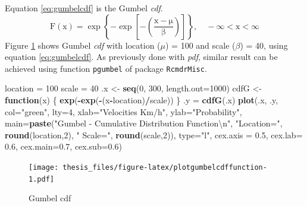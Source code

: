 \documentclass[12pt,twoside]{reedthesis}
\newenvironment{Shaded}{\begin{snugshade}}{\end{snugshade}}
\newcommand{\CharTok}[1]{\textcolor[rgb]{0.31,0.60,0.02}{#1}}
\newcommand{\ControlFlowTok}[1]{\textcolor[rgb]{0.13,0.29,0.53}{\textbf{#1}}}
\newcommand{\DataTypeTok}[1]{\textcolor[rgb]{0.13,0.29,0.53}{#1}}
\newcommand{\DecValTok}[1]{\textcolor[rgb]{0.00,0.00,0.81}{#1}}
\newcommand{\FloatTok}[1]{\textcolor[rgb]{0.00,0.00,0.81}{#1}}
\newcommand{\KeywordTok}[1]{\textcolor[rgb]{0.13,0.29,0.53}{\textbf{#1}}}
\newcommand{\NormalTok}[1]{#1}
\newcommand{\OperatorTok}[1]{\textcolor[rgb]{0.81,0.36,0.00}{\textbf{#1}}}
\newcommand{\StringTok}[1]{\textcolor[rgb]{0.31,0.60,0.02}{#1}}
\begin{document}
Equation \eqref{eq:gumbelcdf} is the Gumbel \emph{cdf}.
\begin{equation}
\mathrm{
        F(x) = \exp\left\{-\exp\left[-\left(\frac{x-\mu}{\beta}\right)\right]\right\}, 
        \quad -\infty < x < \infty
        }
  \label{eq:gumbelcdf}
\end{equation}
Figure \ref{fig:plotgumbelcdffunction} shows Gumbel \emph{cdf} with location (\(\mu\)) = 100 and scale (\(\beta\)) = 40, using equation \eqref{eq:gumbelcdf}. As previously done with \emph{pdf}, similar result can be achieved using function \texttt{pgumbel} of package \texttt{RcmdrMisc}.

\footnotesize
\begin{Shaded}
\begin{Highlighting}[]
\NormalTok{location =}\StringTok{ }\DecValTok{100}
\NormalTok{scale =}\StringTok{ }\DecValTok{40}
\NormalTok{.x <-}\StringTok{ }\KeywordTok{seq}\NormalTok{(}\DecValTok{0}\NormalTok{, }\DecValTok{300}\NormalTok{, }\DataTypeTok{length.out=}\DecValTok{1000}\NormalTok{)}
\NormalTok{cdfG <-}\StringTok{ }\ControlFlowTok{function}\NormalTok{(x) \{}
  \KeywordTok{exp}\NormalTok{(}\OperatorTok{-}\KeywordTok{exp}\NormalTok{(}\OperatorTok{-}\NormalTok{(x}\OperatorTok{-}\NormalTok{location)}\OperatorTok{/}\NormalTok{scale))}
\NormalTok{  \}}
\NormalTok{.y =}\StringTok{ }\KeywordTok{cdfG}\NormalTok{(.x)}
\KeywordTok{plot}\NormalTok{(.x, .y, }\DataTypeTok{col=}\StringTok{"green"}\NormalTok{, }\DataTypeTok{lty=}\DecValTok{4}\NormalTok{, }
     \DataTypeTok{xlab=}\StringTok{"Velocities Km/h"}\NormalTok{, }\DataTypeTok{ylab=}\StringTok{"Probability"}\NormalTok{, }
     \DataTypeTok{main=}\KeywordTok{paste}\NormalTok{(}\StringTok{"Gumbel - Cumulative Distribution Function}\CharTok{\textbackslash{}n}\StringTok{"}\NormalTok{, }\StringTok{"Location="}\NormalTok{, }
     \KeywordTok{round}\NormalTok{(location,}\DecValTok{2}\NormalTok{), }\StringTok{" Scale="}\NormalTok{, }\KeywordTok{round}\NormalTok{(scale,}\DecValTok{2}\NormalTok{)), }\DataTypeTok{type=}\StringTok{"l"}\NormalTok{, }
     \DataTypeTok{cex.axis =} \FloatTok{0.5}\NormalTok{, }\DataTypeTok{cex.lab=} \FloatTok{0.6}\NormalTok{, }\DataTypeTok{cex.main=}\FloatTok{0.7}\NormalTok{, }\DataTypeTok{cex.sub=}\FloatTok{0.6}\NormalTok{)}
\end{Highlighting}
\end{Shaded}
\begin{figure}
\centering
\texttt{[image: thesis\_files/figure-latex/plotgumbelcdffunction-1.pdf]}
\caption{\label{fig:plotgumbelcdffunction}Gumbel cdf}
\end{figure}
\normalsize
\end{document}
